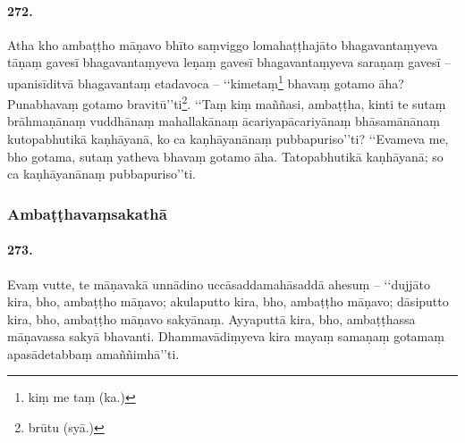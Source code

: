 \paragraph{272.} Atha kho ambaṭṭho māṇavo bhīto saṃviggo lomahaṭṭhajāto bhagavantaṃyeva tāṇaṃ gavesī bhagavantaṃyeva leṇaṃ gavesī bhagavantaṃyeva saraṇaṃ gavesī – upanisīditvā bhagavantaṃ etadavoca – ‘‘kimetaṃ\footnote{kiṃ me taṃ (ka.)} bhavaṃ gotamo āha? Punabhavaṃ gotamo bravitū’’ti\footnote{brūtu (syā.)}. ‘‘Taṃ kiṃ maññasi, ambaṭṭha, kinti te sutaṃ brāhmaṇānaṃ vuddhānaṃ mahallakānaṃ ācariyapācariyānaṃ bhāsamānānaṃ kutopabhutikā kaṇhāyanā, ko ca kaṇhāyanānaṃ pubbapuriso’’ti? ‘‘Evameva me, bho gotama, sutaṃ yatheva bhavaṃ gotamo āha. Tatopabhutikā kaṇhāyanā; so ca kaṇhāyanānaṃ pubbapuriso’’ti.

\subsubsection{Ambaṭṭhavaṃsakathā}

\paragraph{273.} Evaṃ vutte, te māṇavakā unnādino uccāsaddamahāsaddā ahesuṃ – ‘‘dujjāto kira, bho, ambaṭṭho māṇavo; akulaputto kira, bho, ambaṭṭho māṇavo; dāsiputto kira, bho, ambaṭṭho māṇavo sakyānaṃ. Ayyaputtā kira, bho, ambaṭṭhassa māṇavassa sakyā bhavanti. Dhammavādiṃyeva kira mayaṃ samaṇaṃ gotamaṃ apasādetabbaṃ amaññimhā’’ti.

